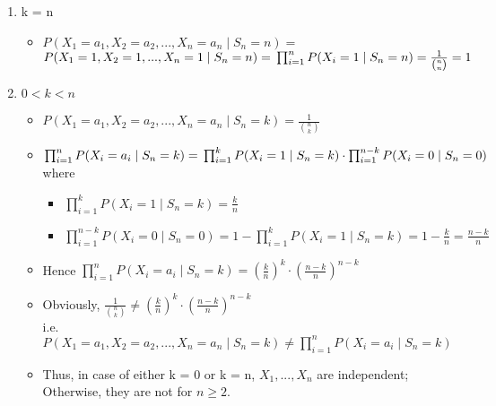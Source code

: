 \documentclass[12pt]{article}
\begin{document}
\begin{enumerate}[label=(\alph*)]
\begin{enumerate}[label=(\roman*)]
        \item k = n 
        
            \begin{itemize}
                \item $P(X_1 = a_1, X_2 = a_2,...,X_n=a_n\;|\;S_n=n)=$\\
                $P(X_1 = 1, X_2 = 1,...,X_n=1\;|\;S_n=n) = \\
                \prod_{i=1}^n P(X_i = 1\;|\;S_n=n) = \frac{1}{\binom nn} = 1$
            \end{itemize}
            
        \item $0 < k < n$
        
            \begin{itemize}
                \item $P(X_1 = a_1, X_2 = a_2, ..., X_n = a_n\;|\;S_n = k) = \frac{1}{\binom nk}$
                
                \item $\prod_{i=1}^n P(X_i = a_i\;|\;S_n=k) =\\ 
                \prod_{i=1}^k P(X_i=1\;|\;S_n=k) \cdot \prod_{i=1}^{n-k} P(X_i = 0\;|\;S_n=0)$\\
                
                where
                \begin{itemize}
                    \item $\prod_{i=1}^k P(X_i=1\;|\;S_n=k) = \frac{k}{n}$
                    \item $ \prod_{i=1}^{n-k} P(X_i = 0\;|\;S_n=0) = 1 - \prod_{i=1}^k P(X_i=1\;|\;S_n=k) = 1 - \frac{k}{n} = \frac{n-k}{n}$\\
                \end{itemize}
                
                
                \item Hence $\prod_{i=1}^n P(X_i = a_i\;|\;S_n=k) = (\frac{k}{n})^k \cdot (\frac{n-k}{n})^{n-k}$
                
                \item Obviously, $\frac{1}{\binom nk} \neq (\frac{k}{n})^k \cdot (\frac{n-k}{n})^{n-k}$\\
                i.e. $P(X_1 = a_1, X_2 = a_2, ..., X_n = a_n\;|\;S_n = k) \neq \prod_{i=1}^n P(X_i = a_i\;|\;S_n=k)$\\
                
                \item Thus, in case of either k = 0 or k = n, $X_1, . . . ,X_n$ are independent; \\
                      Otherwise, they are not for $n \ge 2$.
                
            \end{itemize}
    \end{enumerate}
        
\end{enumerate}
\end{document}
